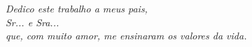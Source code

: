 \begin{dedicatoria}
   \vspace*{\fill}
   \begin{flushright}
   	\textit{Dedico este trabalho a meus pais, \\ Sr... e Sra... \\ que, com muito amor, me ensinaram os valores da vida.}
   	
   \end{flushright}
\end{dedicatoria}
